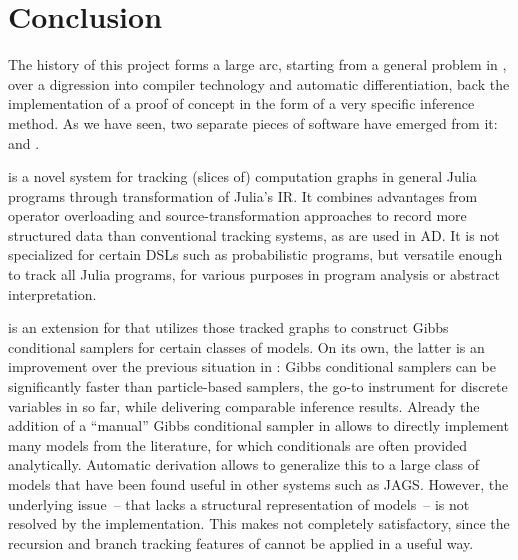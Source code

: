 \chapter{Conclusion}
\label{cha:conclusion}

The history of this project forms a large arc, starting from a general problem in \turingjl{}, over
a digression into compiler technology and automatic differentiation, back the implementation of a
proof of concept in the form of a very specific inference method.  As we have seen, two separate
pieces of software have emerged from it: \irtrackerjl{} and \autogibbsjl{}.

\irtrackerjl{} is a novel system for tracking (slices of) computation graphs in general Julia
programs through transformation of Julia's IR.  It combines advantages from operator overloading and
source-transformation approaches to record more structured data than conventional tracking systems,
as are used in AD.  It is not specialized for certain DSLs such as probabilistic programs, but
versatile enough to track all Julia programs, for various purposes in program analysis or abstract
interpretation.

\autogibbsjl{} is an extension for \turingjl{} that utilizes those tracked graphs to construct Gibbs
conditional samplers for certain classes of models.  On its own, the latter is an improvement over
the previous situation in \turingjl{}: Gibbs conditional samplers can be significantly faster than
particle-based samplers, the go-to instrument for discrete variables in \turingjl{} so far, while
delivering comparable inference results.  Already the addition of a \enquote{manual} Gibbs
conditional sampler in \turingjl{} allows to directly implement many models from the literature, for
which conditionals are often provided analytically.  Automatic derivation allows to generalize this
to a large class of models that have been found useful in other systems such as JAGS.  However, the
underlying issue~-- that \turingjl{} lacks a structural representation of models~-- is not resolved
by the implementation.  This makes \autogibbsjl{} not completely satisfactory, since the recursion
and branch tracking features of \irtrackerjl{} cannot be applied in a useful way.

